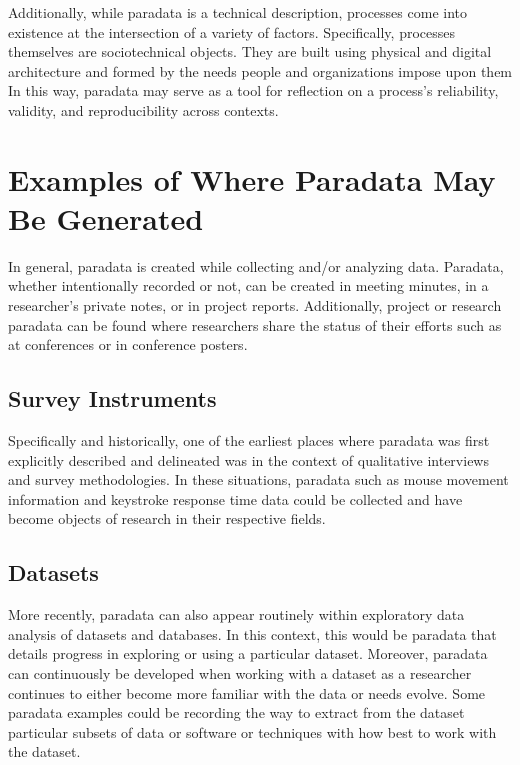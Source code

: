 \documentclass[class=article, crop=false]{standalone}
\begin{document}
Additionally, while paradata is a technical description, processes come into existence at the intersection of a variety of factors.
Specifically, processes themselves are sociotechnical objects.
They are built using physical and digital architecture and formed by the needs people and organizations impose upon them \cite{bowker2000sorting,dourish2022stuff,hine2006databases}
In this way, paradata may serve as a tool for reflection on a process's reliability, validity, and reproducibility across contexts.

\section{Examples of Where Paradata May Be Generated }
\label{first}

In general, paradata is created while collecting and/or analyzing data. \cite{o2017secondary,schenk2024paradata}
Paradata, whether intentionally recorded or not, can be created in meeting minutes, in a researcher's private notes, or in project reports.
Additionally, project or research paradata can be found where researchers share the status of their efforts such as at conferences or in conference posters. \cite{huvilaPerspectivesParadataResearch2024}

\subsection{Survey Instruments}

Specifically and historically, one of the earliest places where paradata was first explicitly described and delineated was in the context of qualitative interviews and survey methodologies.
In these situations, paradata such as mouse movement information and keystroke response time data could be collected and have become objects of research in their respective fields. \cite{fahmy2017using}

\subsection{Datasets}

More recently, paradata can also appear routinely within exploratory data analysis of datasets and databases.
In this context, this would be paradata that details progress in exploring or using a particular dataset.
Moreover, paradata can continuously be developed when working with a dataset as a researcher continues to either become more familiar with the data or needs evolve.
Some paradata examples could be recording the way to extract from the dataset particular subsets of data or software or techniques with how best to work with the dataset. 
\end{document}
